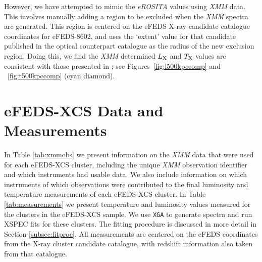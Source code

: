 \documentclass[fleqn,usenatbib]{mnras}
\begin{document}
However, we have attempted to mimic the {\em eROSITA} values using {\em XMM} data. This involves manually adding a region to be excluded when the {\em XMM} spectra are generated. This region is centered on the eFEDS X-ray candidate catalogue coordinates for eFEDS-8602, and uses the `extent' value for that candidate published in the optical counterpart catalogue as the radius of the new exclusion region. Doing this, we find the {\em XMM} determined $L_{\rm{X}}$ and $T_{\rm{X}}$ values are consistent with those presented in \cite{efedsclustercat}; see Figures~\ref{fig:l500kpccomp} and ~\ref{fig:t500kpccomp} (cyan diamond). 

\section{\lowercase{e}FEDS-XCS Data and Measurements}
\label{app:measurements}
In Table \ref{tab:xmmobs} we present information on the {\em XMM} data that were used for each eFEDS-XCS cluster, including the unique {\em XMM} observation identifier and which instruments had usable data. We also include information on which instruments of which observations were contributed to the final luminosity and temperature measurements of each eFEDS-XCS cluster. 
In Table \ref{tab:measurements} we present temperature and luminosity values measured for the clusters in the eFEDS-XCS sample. We use \texttt{XGA} to generate spectra and run XSPEC fits for these clusters. The fitting procedure is discussed in more detail in Section \ref{subsec:fitproc}. All measurements are centered on the eFEDS coordinates from the X-ray cluster candidate catalogue, with redshift information also taken from that catalogue.
\end{document}
